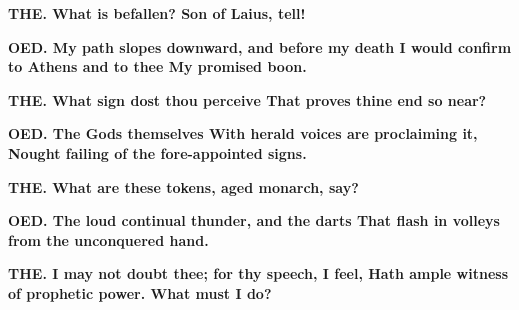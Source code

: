 \documentclass[11pt,letter]{book}
\begin{document}
\par \textbf{THE. What is befallen? Son of Laius, tell!}
\par 

\par \textbf{OED. My path slopes downward, and before my death I would confirm to Athens and to thee My promised boon.}
\par 

\par \textbf{THE. What sign dost thou perceive That proves thine end so near?}
\par 

\par \textbf{OED. The Gods themselves With herald voices are proclaiming it, Nought failing of the fore-appointed signs.}
\par 

\par \textbf{THE. What are these tokens, aged monarch, say?}
\par 

\par \textbf{OED. The loud continual thunder, and the darts That flash in volleys from the unconquered hand.}
\par 

\par \textbf{THE. I may not doubt thee; for thy speech, I feel, Hath ample witness of prophetic power. What must I do?}
\par 
\end{document}
